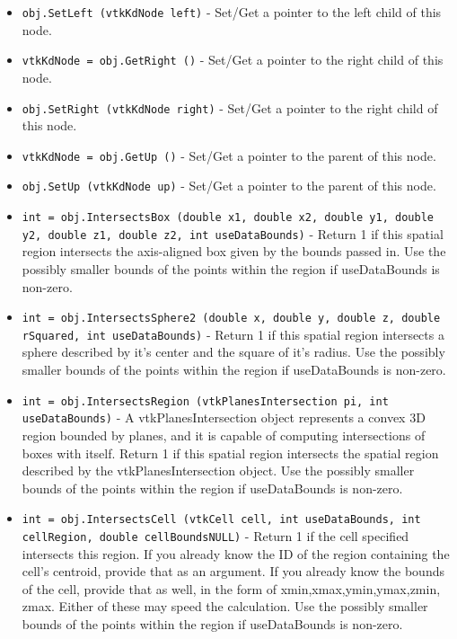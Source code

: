 \begin{itemize}
\item  \verb|obj.SetLeft (vtkKdNode left)| -    Set/Get a pointer to the left child of this node.

\item  \verb|vtkKdNode = obj.GetRight ()| -    Set/Get a pointer to the right child of this node.

\item  \verb|obj.SetRight (vtkKdNode right)| -    Set/Get a pointer to the right child of this node.

\item  \verb|vtkKdNode = obj.GetUp ()| -    Set/Get a pointer to the parent of this node.

\item  \verb|obj.SetUp (vtkKdNode up)| -    Set/Get a pointer to the parent of this node.

\item  \verb|int = obj.IntersectsBox (double x1, double x2, double y1, double y2, double z1, double z2, int useDataBounds)| -    Return 1 if this spatial region intersects the axis-aligned box given
   by the bounds passed in.  Use the possibly smaller bounds of the points
   within the region if useDataBounds is non-zero.

\item  \verb|int = obj.IntersectsSphere2 (double x, double y, double z, double rSquared, int useDataBounds)| -    Return 1 if this spatial region intersects a sphere described by
   it's center and the square of it's radius. Use the possibly smaller 
   bounds of the points within the region if useDataBounds is non-zero.

\item  \verb|int = obj.IntersectsRegion (vtkPlanesIntersection pi, int useDataBounds)| -    A vtkPlanesIntersection object represents a convex 3D region bounded
   by planes, and it is capable of computing intersections of
   boxes with itself.  Return 1 if this spatial region intersects
   the spatial region described by the vtkPlanesIntersection object.
   Use the possibly smaller bounds of the points within the region 
   if useDataBounds is non-zero.

\item  \verb|int = obj.IntersectsCell (vtkCell cell, int useDataBounds, int cellRegion, double cellBoundsNULL)| -    Return 1 if the cell specified intersects this region.  If you
   already know the ID of the region containing the cell's centroid,
   provide that as an argument.  If you already know the bounds of the
   cell, provide that as well, in the form of xmin,xmax,ymin,ymax,zmin,
   zmax.  Either of these may speed the calculation.
   Use the possibly smaller bounds of the points within the region 
   if useDataBounds is non-zero.


\end{itemize}

